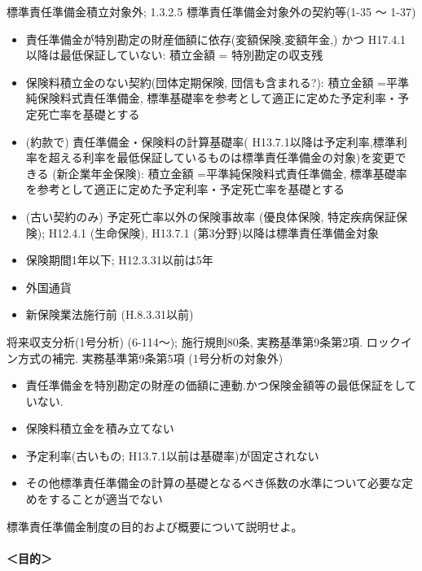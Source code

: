\documentclass[report,gutter=10mm,fore-edge=10mm,uplatex,dvipdfmx]{jlreq}
\begin{document}
標準責任準備金積立対象外; 1.3.2.5 標準責任準備金対象外の契約等(1-35 〜 1-37)
\begin{itemize}
 \item 責任準備金が特別勘定の財産価額に依存(変額保険,変額年金,) かつ H17.4.1以降は最低保証していない: 積立金額 = 特別勘定の収支残
 \item 保険料積立金のない契約(団体定期保険, 団信も含まれる?): 積立金額 =平準純保険料式責任準備金, 標準基礎率を参考として適正に定めた予定利率・予定死亡率を基礎とする
 \item  (約款で) 責任準備金・保険料の計算基礎率( H13.7.1以降は予定利率,標準利率を超える利率を最低保証しているものは標準責任準備金の対象)を変更できる (新企業年金保険): 積立金額 =平準純保険料式責任準備金, 標準基礎率を参考として適正に定めた予定利率・予定死亡率を基礎とする
 \item (古い契約のみ) 予定死亡率以外の保険事故率 (優良体保険, 特定疾病保証保険); H12.4.1 (生命保険), H13.7.1 (第3分野)以降は標準責任準備金対象
 \item 保険期間1年以下; H12.3.31以前は5年
 \item 外国通貨
 \item 新保険業法施行前 (H.8.3.31以前)
\end{itemize}

将来収支分析(1号分析) (6-114〜); 施行規則80条, 実務基準第9条第2項. ロックイン方式の補完. 
実務基準第9条第5項 (1号分析の対象外)

\begin{itemize}
 \item 責任準備金を特別勘定の財産の価額に連動.かつ保険金額等の最低保証をしていない. 
 \item 保険料積立金を積み立てない
 \item 予定利率(古いもの; H13.7.1以前は基礎率)が固定されない
 \item その他標準責任準備金の計算の基礎となるべき係数の水準について必要な定めをすることが適当でない
\end{itemize}



標準責任準備金制度の目的および概要について説明せよ。


\paragraph{＜目的＞}
\end{document}

